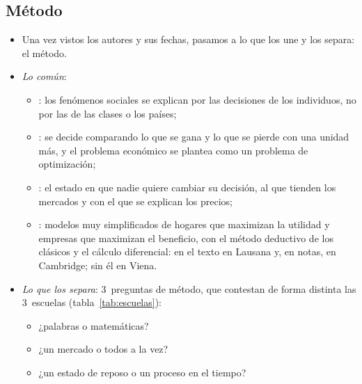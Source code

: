 \documentclass[11pt]{article}
\begin{document}
\subsection{Método}\label{sec:metodo}

\begin{itemize}
\item Una vez vistos los autores y sus fechas, pasamos a lo que los une y los separa: el método.
\item \emph{Lo común}:
  \begin{itemize}
  \item {}: los fenómenos sociales se explican por las decisiones de los individuos, no por las de las clases o los países;
  \item {}: se decide comparando lo que se gana y lo que se pierde con una unidad más, y el problema económico se plantea como un problema de optimización;
  \item {}: el estado en que nadie quiere cambiar su decisión, al que tienden los mercados y con el que se explican los precios;
  \item {}: modelos muy simplificados de hogares que maximizan la utilidad y empresas que maximizan el beneficio, con el método deductivo de los clásicos y el cálculo diferencial: en el texto en Lausana y, en notas, en Cambridge; sin él en Viena.
  \end{itemize}
\item \emph{Lo que los separa}: 3~preguntas de método, que contestan de forma distinta las 3~escuelas (tabla~\ref{tab:escuelas}):
  \begin{itemize}
  \item ¿palabras o matemáticas?
  \item ¿un mercado o todos a la vez?
  \item ¿un estado de reposo o un proceso en el tiempo?
  \end{itemize}
\end{itemize}
\end{document}

